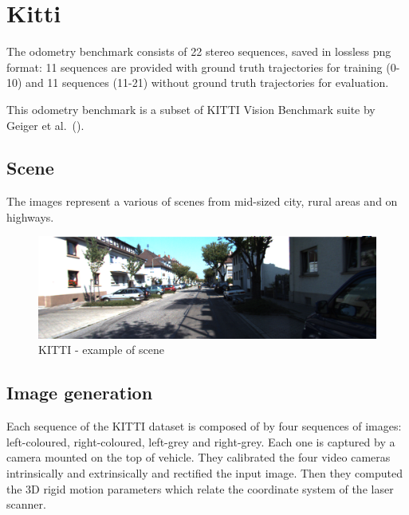 
\section{Kitti}
\label{sec:kitti}

The odometry benchmark consists of 22 stereo sequences, saved in loss\-less png format: 11 sequences are provided with ground truth trajectories for training (0-10) and 11 sequences (11-21) without ground truth trajectories for evaluation.

This odometry benchmark is a subset of KITTI Vision Benchmark suite by Geiger et al.~(\cite{kitti_dataset}).

\subsection{Scene}\label{subsec:kitti-scene}
The images represent a various of scenes from mid-sized city, rural areas and on highways.
\begin{figure}[H]
    \centering
    \includegraphics[width=\textwidth]{images/3_1_example_kitti_scene}
    \caption{KITTI - example of scene}\label{fig:example-of-kitti-scene}
\end{figure}

\subsection{Image generation}\label{subsec:kitti-image-generation}
Each sequence of the KITTI dataset is composed of by four sequences of images: left-coloured, right-coloured, left-grey and right-grey.
Each one is captured by a camera mounted on the top of vehicle.
They calibrated the four video cameras intrinsically and extrinsically and rectified the input image.
Then they computed the 3D rigid motion parameters which relate the coordinate system of the laser scanner.

